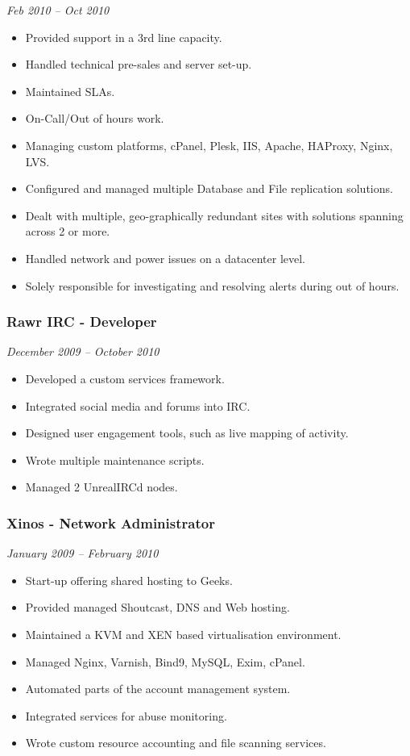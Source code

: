\emph{Feb 2010 -- Oct 2010}

\begin{itemize}
\item
  Provided support in a 3rd line capacity.
\item
  Handled technical pre-sales and server set-up.
\item
  Maintained SLAs.
\item
  On-Call/Out of hours work.
\item
  Managing custom platforms, cPanel, Plesk, IIS, Apache, HAProxy, Nginx,
  LVS.
\item
  Configured and managed multiple Database and File replication
  solutions.
\item
  Dealt with multiple, geo-graphically redundant sites with solutions
  spanning across 2 or more.
\item
  Handled network and power issues on a datacenter level.
\item
  Solely responsible for investigating and resolving alerts during out
  of hours.
\end{itemize}

\subsubsection{Rawr IRC - Developer}

\emph{December 2009 -- October 2010}

\begin{itemize}
\item
  Developed a custom services framework.
\item
  Integrated social media and forums into IRC.
\item
  Designed user engagement tools, such as live mapping of activity.
\item
  Wrote multiple maintenance scripts.
\item
  Managed 2 UnrealIRCd nodes.
\end{itemize}

\subsubsection{Xinos - Network Administrator}

\emph{January 2009 -- February 2010}

\begin{itemize}
\item
  Start-up offering shared hosting to Geeks.
\item
  Provided managed Shoutcast, DNS and Web hosting.
\item
  Maintained a KVM and XEN based virtualisation environment.
\item
  Managed Nginx, Varnish, Bind9, MySQL, Exim, cPanel.
\item
  Automated parts of the account management system.
\item
  Integrated services for abuse monitoring.
\item
  Wrote custom resource accounting and file scanning services.
\end{itemize}

